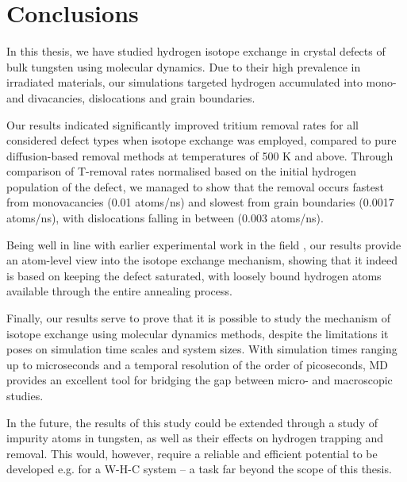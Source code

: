 \chapter{Conclusions}

In this thesis, we have studied hydrogen isotope exchange in crystal defects of bulk tungsten using molecular dynamics. 
Due to their high prevalence in irradiated materials, our simulations targeted hydrogen accumulated into mono- and divacancies, dislocations and grain boundaries.  

Our results indicated significantly improved tritium removal rates for all considered defect types when isotope exchange was employed, compared to pure diffusion-based removal methods at temperatures of 500 K and above.
Through comparison of T-removal rates normalised based on the initial hydrogen population of the defect, we managed to show that the removal occurs fastest from monovacancies (0.01 atoms/ns) and slowest from grain boundaries (0.0017 atoms/ns), with dislocations falling in between (0.003 atoms/ns).

Being well in line with earlier experimental work in the field \cite{ahlgren2019hydrogen}, our results provide an atom-level view into the isotope exchange mechanism, showing that it indeed is based on keeping the defect saturated, with loosely bound hydrogen atoms available through the entire annealing process.

Finally, our results serve to prove that it is possible to study the mechanism of isotope exchange using molecular dynamics methods, despite the limitations it poses on simulation time scales and system sizes.
With simulation times ranging up to microseconds and a temporal resolution of the order of picoseconds, MD provides an excellent tool for bridging the gap between micro- and macroscopic studies.

In the future, the results of this study could be extended through a study of impurity atoms in tungsten, as well as their effects on hydrogen trapping and removal.
This would, however, require a reliable and efficient potential to be developed e.g. for a W-H-C system -- a task far beyond the scope of this thesis.
